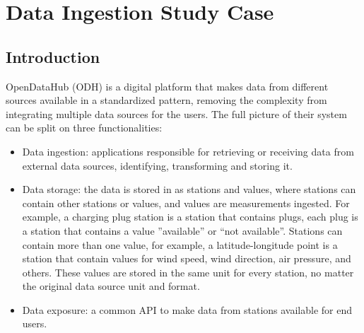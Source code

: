 

\newcommand{\sla}{\textbackslash}

\newcommand{\cmd}[1]{\textsf{#1}}

\newcommand{\pkg}[1]{\textsf{#1}}

\newcommand{\ltxcmd}[1]{\cmd{\sla{}#1}}

\chapter{Data Ingestion Study Case}
\label{chap:dataingestion}

\section{Introduction}
\label{sec:introduction}
OpenDataHub (ODH) is a digital platform that makes data from different sources available in a standardized pattern, removing the complexity from integrating multiple data sources for the users. The full picture of their system can be split on three functionalities:

\begin{itemize}
    \item Data ingestion: applications responsible for retrieving or receiving data from external data sources, identifying, transforming and storing it.
    \item Data storage: the data is stored in as stations and values, where stations can contain other stations or values, and values are measurements ingested. For example, a charging plug station is a station that contains plugs, each plug is a station that contains a value ”available” or “not available”. Stations can contain more than one value, for example, a latitude-longitude point is a station that contain values for wind speed, wind direction, air pressure, and others. These values are stored in the same unit for every station, no matter the original data source unit and format.
    \item Data exposure: a common API to make data from stations available for end users.
\end{itemize}

